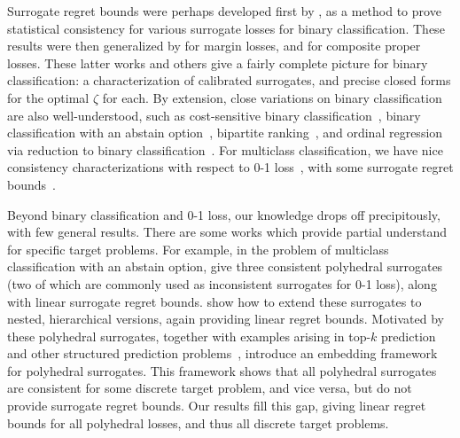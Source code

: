\documentclass{article}
\theoremstyle{definition}\newtheorem{definition}{Definition}
\theoremstyle{definition}\newtheorem{assumption}{Assumption}
\begin{document}
Surrogate regret bounds were perhaps developed first by \citet{zhang2004statistical}, as a method to prove statistical consistency for various surrogate losses for binary classification.
These results were then generalized by \citet{bartlett2006convexity} for margin losses, and \citet{reid2009surrogate} for composite proper losses.
These latter works and others give a fairly complete picture for binary classification: a characterization of calibrated surrogates, and precise closed forms for the optimal $\zeta$ for each.
By extension, close variations on binary classification are also well-understood, such as  cost-sensitive binary classification~\citep{scott2012calibrated}, binary classification with an abstain option~\citep{bartlett2008classification,yuan2010classification}, bipartite ranking~\citep{agarwal2014surrogate,menon2016bipartite}, and ordinal regression via reduction to binary classification~\citep{pedregosa2017consistency}.
For multiclass classification, we have nice consistency characterizations with respect to 0-1 loss~\citep{tewari2007consistency}, with some surrogate regret bounds~\citep{pires2013cost,duchi2018multiclass}.

Beyond binary classification and 0-1 loss, our knowledge drops off precipitously, with few general results.
There are some works which provide partial understand for specific target problems.
For example, in the problem of multiclass classification with an abstain option, \citet{ramaswamy2018consistent} give three consistent polyhedral surrogates (two of which are commonly used as inconsistent surrogates for 0-1 loss), along with linear surrogate regret bounds.
\citet{ramaswamy2015hierarchical} show how to extend these surrogates to nested, hierarchical versions, again providing linear regret bounds.
Motivated by these polyhedral surrogates, together with examples arising in top-$k$ prediction~\citep{lapin2016loss,yang2018consistency} and other structured prediction problems~\citep{yu2018lovasz}, \citet{finocchiaro2019embedding} introduce an embedding framework for polyhedral surrogates.
This framework shows that all polyhedral surrogates are consistent for some discrete target problem, and vice versa, but do not provide surrogate regret bounds.
Our results fill this gap, giving linear regret bounds for all polyhedral losses, and thus all discrete target problems.
\end{document}

